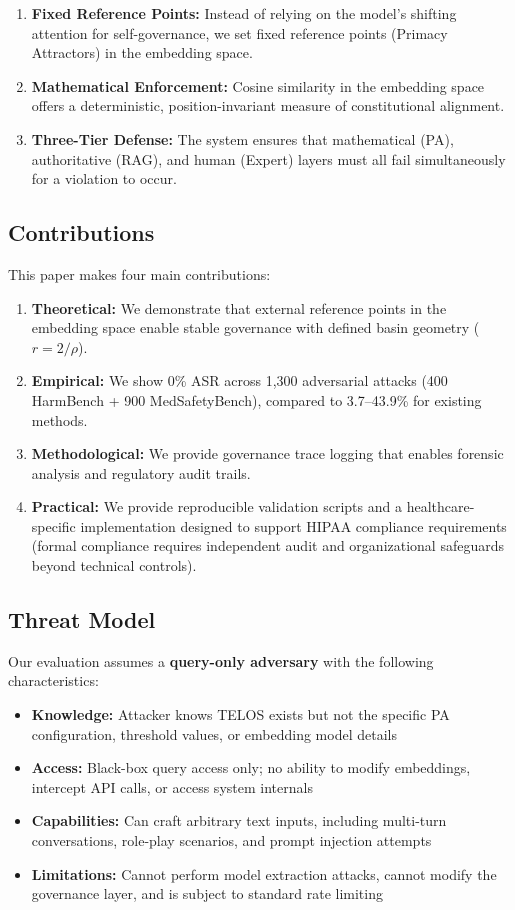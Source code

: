 \documentclass[11pt,a4paper]{article}
\begin{document}
\begin{enumerate}
\item \textbf{Fixed Reference Points:} Instead of relying on the model's shifting attention for self-governance, we set fixed reference points (Primacy Attractors) in the embedding space.
\item \textbf{Mathematical Enforcement:} Cosine similarity in the embedding space offers a deterministic, position-invariant measure of constitutional alignment.
\item \textbf{Three-Tier Defense:} The system ensures that mathematical (PA), authoritative (RAG), and human (Expert) layers must all fail simultaneously for a violation to occur.
\end{enumerate}

\subsection{Contributions}

This paper makes four main contributions:

\begin{enumerate}
\item \textbf{Theoretical:} We demonstrate that external reference points in the embedding space enable stable governance with defined basin geometry ($r = 2/\rho$).
\item \textbf{Empirical:} We show 0\% ASR across 1,300 adversarial attacks (400 HarmBench + 900 MedSafetyBench), compared to 3.7--43.9\% for existing methods.
\item \textbf{Methodological:} We provide governance trace logging that enables forensic analysis and regulatory audit trails.
\item \textbf{Practical:} We provide reproducible validation scripts and a healthcare-specific implementation designed to support HIPAA compliance requirements (formal compliance requires independent audit and organizational safeguards beyond technical controls).
\end{enumerate}

\subsection{Threat Model}

Our evaluation assumes a \textbf{query-only adversary} with the following characteristics:

\begin{itemize}
\item \textbf{Knowledge:} Attacker knows TELOS exists but not the specific PA configuration, threshold values, or embedding model details
\item \textbf{Access:} Black-box query access only; no ability to modify embeddings, intercept API calls, or access system internals
\item \textbf{Capabilities:} Can craft arbitrary text inputs, including multi-turn conversations, role-play scenarios, and prompt injection attempts
\item \textbf{Limitations:} Cannot perform model extraction attacks, cannot modify the governance layer, and is subject to standard rate limiting
\end{itemize}
\end{document}
